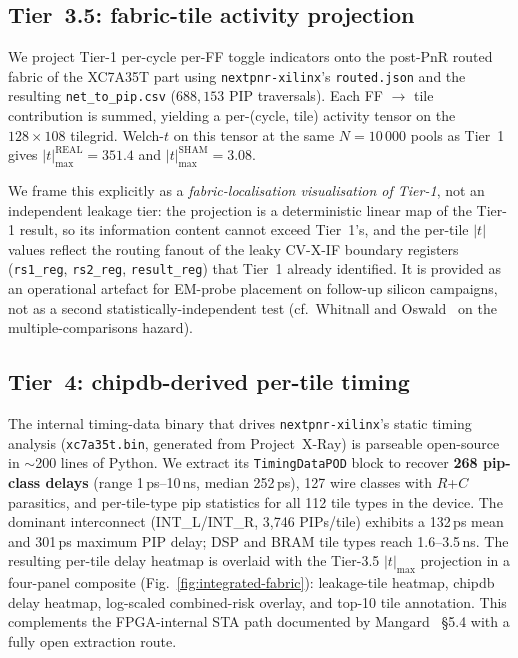 \subsection{Tier~3.5: fabric-tile activity projection}
\label{sec:tier35}

We project Tier-1 per-cycle per-FF toggle indicators onto the post-PnR routed
fabric of the XC7A35T part using \texttt{nextpnr-xilinx}'s
\texttt{routed.json} and the resulting \texttt{net\_to\_pip.csv}
($688{,}153$ PIP traversals).  Each FF $\to$ tile contribution is summed,
yielding a per-(cycle, tile) activity tensor on the $128 \times 108$ tilegrid.
Welch-$t$ on this tensor at the same $N{=}10\,000$ pools as Tier~1 gives
$|t|_\mathrm{max}^{\mathrm{REAL}} = 351.4$ and
$|t|_\mathrm{max}^{\mathrm{SHAM}} = 3.08$.

We frame this explicitly as a \emph{fabric-localisation visualisation of
Tier-1}, not an independent leakage tier: the projection is a deterministic
linear map of the Tier-1 result, so its information content cannot exceed
Tier~1's, and the per-tile $|t|$ values reflect the routing fanout of the
leaky CV-X-IF boundary registers (\texttt{rs1\_reg}, \texttt{rs2\_reg},
\texttt{result\_reg}) that Tier~1 already identified.  It is provided as an
operational artefact for EM-probe placement on follow-up silicon campaigns,
not as a second statistically-independent test (cf.\ Whitnall and
Oswald~\cite{whitnall2019iso17825} on the multiple-comparisons hazard).

\subsection{Tier~4: chipdb-derived per-tile timing}
\label{sec:tier4}

The internal timing-data binary that drives \texttt{nextpnr-xilinx}'s static
timing analysis (\texttt{xc7a35t.bin}, generated from Project~X-Ray) is
parseable open-source in $\sim$200 lines of Python.  We extract its
\texttt{TimingDataPOD} block to recover \textbf{268 pip-class delays}
(range 1\,ps--10\,ns, median 252\,ps), 127 wire classes with $R$+$C$
parasitics, and per-tile-type pip statistics for all 112 tile types in the
device.  The dominant interconnect (INT\_L/INT\_R, 3{,}746 PIPs/tile)
exhibits a 132\,ps mean and 301\,ps maximum PIP delay; DSP and BRAM tile
types reach 1.6--3.5\,ns.  The resulting per-tile delay heatmap is overlaid
with the Tier-3.5 $|t|_\mathrm{max}$ projection in a four-panel composite
(Fig.~\ref{fig:integrated-fabric}): leakage-tile heatmap, chipdb delay
heatmap, log-scaled combined-risk overlay, and top-10 tile annotation.
This complements the FPGA-internal STA path documented by
Mangard~\cite{mangard2007power} \S5.4 with a fully open extraction route.

